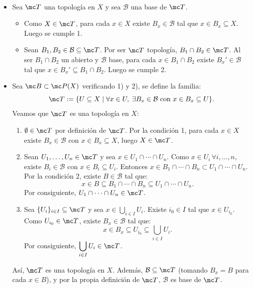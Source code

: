 \begin{dem} \, 
\begin{itemize}
    \item[(\(\Rightarrow\))] Sea \(\mc T\) una topología en \(X\) y sea \(\mathcal{B}\) una base de \(\mc T\).
    \begin{itemize}
        \item Como \(X \in \mc T\), para cada \(x \in X\) existe \(B_x \in \mathcal{B}\) tal que \(x \in B_x \subseteq X\). Luego se cumple 1.
        \item Sean \(B_1, B_2 \in \mathcal{B} \subseteq \mc T\). Por ser \(\mc T\) topología, \(B_1 \cap B_2 \in \mc T\). Al ser \(B_1 \cap B_2\) un abierto y \(\mathcal{B}\) base, para cada \(x \in B_1 \cap B_2\) existe \(B_x' \in \mathcal{B}\) tal que \(x \in B_x' \subseteq B_1 \cap B_2\). Luego se cumple 2.
    \end{itemize}
    \item[(\(\Leftarrow\))] Sea $\mc B \subset \mc P(X)$ verificando 1) y 2), se define la familia:
    \[
        \mc T := \{U \subseteq X \mid \forall x \in U, \; \exists B_x \in \mathcal{B} \text{ con } x \in B_x \subseteq U\} \text{}.
    \]
    Veamos que \(\mc T\) es una topología en \(X\):
    \begin{enumerate}
        \item[\textbf{a)}] \(\emptyset \in \mc T\) por definición de $\mc T$. Por la condición 1, para cada \(x \in X\) existe \(B_x \in \mathcal{B}\) con \(x \in B_x \subseteq X\), luego \(X \in \mc T\).
        \item[\textbf{b)}] Sean \(U_1, \ldots, U_n \in \mc T\) y sea \(x \in U_1 \cap \cdots \cap U_n\). Como \(x \in U_i\, \forall i, \ldots, n\), existe \(B_i \in \mathcal{B}\) con \(x \in B_i \subseteq U_i\). Entonces \(x \in B_1 \cap \cdots \cap B_n \subset U_1 \cap \cdots \cap U_n\). Por la condición 2, existe \(B \in \mathcal{B}\) tal que:
        \[
            x \in B \subseteq B_1 \cap \cdots \cap B_n \subseteq U_1 \cap \cdots \cap U_n \text{}.
        \]
        Por consiguiente, \( U_1 \cap \cdots \cap U_n \in \mc T\).
        \item[\textbf{c)}] Sea \(\{U_i\}_{i \in I} \subseteq \mc T\) y sea \(x \in \bigcup_{i \in I} U_i\). Existe \(i_0 \in I\) tal que \(x \in U_{i_0}\). Como \(U_{i_0} \in \mc T\), existe \(B_x \in \mathcal{B}\) tal que:
        \[
            x \in B_x \subseteq U_{i_0} \subseteq \bigcup_{i \in I} U_i \text{}.
        \]
        Por consiguiente, \( \displaystyle \bigcup_{i \in I} U_i \in \mc T\).
    \end{enumerate}
    Así, \(\mc T\) es una topología en \(X\). Además, \(\mathcal{B} \subseteq \mc T\) (tomando \(B_x = B\) para cada \(x \in B\)), y por la propia definición de \(\mc T\), \(\mathcal{B}\) es base de \(\mc T\).
    

\end{itemize}
\end{dem}

